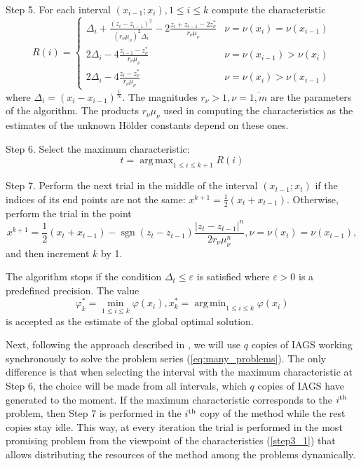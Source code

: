\documentclass[runningheads]{llncs}
\DeclareMathOperator*{\argmax}{arg\,max}
\DeclareMathOperator*{\argmin}{arg\,min}
\begin{document}
Step 5. For each interval \((x_{i-1};x_{i}),1\leqslant i\leqslant k\) compute the characteristic
\begin{equation}
  \label{step3_1}
  R(i)={\begin{cases}\Delta _{i}+{\frac {(z_{i}-z_{i-1})^{2}}{(r_{\nu }\mu _{\nu
})^{2}\Delta _{i}}}-2{\frac {z_{i}+z_{i-1}-2z_{\nu }^{*}}{r_{\nu }\mu _{\nu }}}&\nu =\nu
(x_{i})=\nu (x_{i-1})\\2\Delta _{i}-4{\frac {z_{i-1}-z_{\nu }^{*}}{r_{\nu }\mu _{\nu
}}}&\nu =\nu (x_{i-1})>\nu (x_{i})\\2\Delta _{i}-4{\frac {z_{i}-z_{\nu }^{*}}{r_{\nu }\mu
_{\nu }}}&\nu =\nu (x_{i})>\nu (x_{i-1})\end{cases}}
\end{equation}
where \(\Delta_{i}=(x_{i}-x_{i-1})^{\frac{1}{N}}\).
The magnitudes \(r_{\nu }>1,\nu ={\overline {1,m}}\) are the parameters of the algorithm.
The products \(r_{\nu}\mu_{\nu}\) used in computing the characteristics as the estimates of the
unknown H\"{o}lder constants depend on these ones.

Step 6. Select the maximum characteristic:
\begin{equation}
\label{step4}
t=\argmax_{1\leqslant i \leqslant k+1}R(i)
\end{equation}

Step 7. Perform the next trial in the middle of the interval \((x_{t-1};x_{t})\) if the indices of its
end points are not the same: \(x^{k+1}={\frac {1}{2}}(x_{t}+x_{t-1})\).
Otherwise, perform the trial in the point
\begin{displaymath}
  x^{k+1}={\frac {1}{2}}(x_{t}+x_{t-1})-\operatorname {sgn}(z_{t}-z_{t-1}){\frac {|z_{t}-
z_{t-1}|^{n}}{2r_{\nu }\mu _{\nu }^{n}}},\nu =\nu (x_{t})=\nu (x_{t-1}),
\end{displaymath}
and then increment \(k\) by 1.

The algorithm stops if the condition \(\Delta_{t}\leqslant \varepsilon\) is satisfied where
\(\varepsilon>0\) is a predefined precision.
The value
\begin{equation}
\varphi_k^*=\min_{1\leqslant i \leqslant k}\varphi(x_i), x_k^*=\argmin_{1\leqslant i \leqslant
k}\varphi(x_i)
\end{equation}
is accepted as the estimate of the global optimal solution.

Next, following the approach described in \cite{BarkalovStrongin2018}, we will use \(q\) copies
of IAGS working synchronously to solve the problem series (\ref{eq:many_problems}).
The only difference is that when selecting the interval with the maximum characteristic at Step
6, the choice will be made from all intervals, which \(q\) copies of IAGS have generated to the
moment.
If the maximum characteristic corresponds to the \(i^{\rm th}\) problem, then Step 7 is
performed in the \(i^{\rm th}\) copy of the method while the rest copies stay idle.
This way, at every iteration the trial is performed in the most promising problem from the
viewpoint of the characteristics (\ref{step3_1}) that allows distributing the resources of the
method among the problems dynamically.
\end{document}
